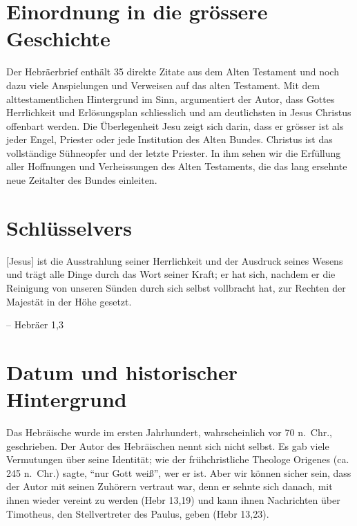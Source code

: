 \documentclass[
  12pt,
]{krantz}
\makeatletter
\newenvironment{kframe}{%
\medskip{}
\setlength{\fboxsep}{.8em}
 \def\at@end@of@kframe{}%
 \ifinner\ifhmode%
  \def\at@end@of@kframe{\end{minipage}}%
  \begin{minipage}{\columnwidth}%
 \fi\fi%
 \def\FrameCommand##1{\hskip\@totalleftmargin \hskip-\fboxsep
 \colorbox{shadecolor}{##1}\hskip-\fboxsep
     \hskip-\linewidth \hskip-\@totalleftmargin \hskip\columnwidth}%
 \MakeFramed {\advance\hsize-\width
   \@totalleftmargin\z@ \linewidth\hsize
   \@setminipage}}%
 {\par\unskip\endMakeFramed%
 \at@end@of@kframe}
\newenvironment{rmdblock}[1]
  {
  \begin{itemize}
  \renewcommand{\labelitemi}{
    \raisebox{-.7\height}[0pt][0pt]{
      {\setkeys{Gin}{width=3em,keepaspectratio}\texttt{[image: img/\#1]}}
    }
  }
  \setlength{\fboxsep}{1em}
  \begin{kframe}
  \item
  }
  {
  \end{kframe}
  \end{itemize}
  }
\newenvironment{rmdquote}
  {\begin{rmdblock}{quote}}
  {\end{rmdblock}}
\makeatother
\begin{document}
\hypertarget{einordnung-in-die-gruxf6ssere-geschichte}{%
\section{Einordnung in die grössere Geschichte}\label{einordnung-in-die-gruxf6ssere-geschichte}}

Der Hebräerbrief enthält 35 direkte Zitate aus dem Alten Testament und noch dazu viele Anspielungen und Verweisen auf das alten Testament. Mit dem alttestamentlichen Hintergrund im Sinn, argumentiert der Autor, dass Gottes Herrlichkeit und Erlösungsplan schliesslich und am deutlichsten in Jesus Christus offenbart werden. Die Überlegenheit Jesu zeigt sich darin, dass er grösser ist als jeder Engel, Priester oder jede Institution des Alten Bundes. Christus ist das vollständige Sühneopfer und der letzte Priester. In ihm sehen wir die Erfüllung aller Hoffnungen und Verheissungen des Alten Testaments, die das lang ersehnte neue Zeitalter des Bundes einleiten.

\hypertarget{schluxfcsselvers}{%
\section{Schlüsselvers}\label{schluxfcsselvers}}

\begin{rmdquote}
{[}Jesus{]} ist die Ausstrahlung seiner Herrlichkeit und der Ausdruck
seines Wesens und trägt alle Dinge durch das Wort seiner Kraft; er hat
sich, nachdem er die Reinigung von unseren Sünden durch sich selbst
vollbracht hat, zur Rechten der Majestät in der Höhe gesetzt.

-- Hebräer 1,3
\end{rmdquote}

\hypertarget{datum-und-historischer-hintergrund}{%
\section{Datum und historischer Hintergrund}\label{datum-und-historischer-hintergrund}}

Das Hebräische wurde im ersten Jahrhundert, wahrscheinlich vor 70 n.~Chr., geschrieben. Der Autor des Hebräischen nennt sich nicht selbst. Es gab viele Vermutungen über seine Identität; wie der frühchristliche Theologe Origenes (ca. 245 n.~Chr.) sagte, ``nur Gott weiß'', wer er ist. Aber wir können sicher sein, dass der Autor mit seinen Zuhörern vertraut war, denn er sehnte sich danach, mit ihnen wieder vereint zu werden (Hebr 13,19) und kann ihnen Nachrichten über Timotheus, den Stellvertreter des Paulus, geben (Hebr 13,23).
\end{document}
